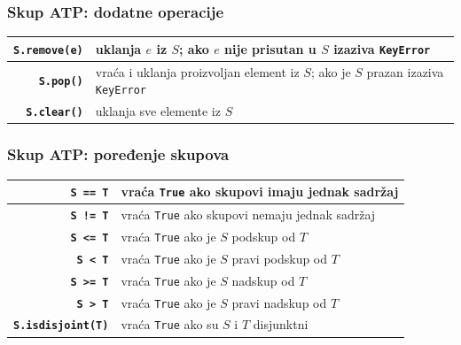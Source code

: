 \documentclass[compress]{beamer}
\begin{document}
\begin{frame}[fragile]
  \frametitle{Skup ATP: dodatne operacije}
  \begin{center}
    \begin{tabular}{rp{8cm}}
      \textbf{\texttt{S.remove(e)}} & uklanja $e$ iz $S$; ako $e$ nije prisutan u $S$ izaziva \texttt{KeyError}\\ \hline
      \textbf{\texttt{S.pop()}} & vraća i uklanja proizvoljan element iz $S$; ako je $S$ prazan izaziva \texttt{KeyError}\\ \hline
      \textbf{\texttt{S.clear()}} & uklanja sve elemente iz $S$ \\
    \end{tabular}
  \end{center}
\end{frame}

\begin{frame}[fragile]
  \frametitle{Skup ATP: poređenje skupova}
  \begin{center}
    \begin{tabular}{rp{7.5cm}}
      \textbf{\texttt{S == T}} & vraća \texttt{True} ako skupovi imaju jednak sadržaj \\ \hline
      \textbf{\texttt{S != T}} & vraća \texttt{True} ako skupovi nemaju jednak sadržaj \\ \hline
      \textbf{\texttt{S <= T}} & vraća \texttt{True} ako je $S$ podskup od $T$ \\ \hline
      \textbf{\texttt{S < T}} & vraća \texttt{True} ako je $S$ pravi podskup od $T$ \\ \hline
      \textbf{\texttt{S >= T}} & vraća \texttt{True} ako je $S$ nadskup od $T$ \\ \hline
      \textbf{\texttt{S > T}} & vraća \texttt{True} ako je $S$ pravi nadskup od $T$ \\ \hline
      \textbf{\texttt{S.isdisjoint(T)}} & vraća \texttt{True} ako su $S$ i $T$ disjunktni \\
    \end{tabular}
  \end{center}
\end{frame}
\end{document}
